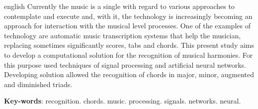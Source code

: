 \begin{resumo}[Abstract]
 \begin{otherlanguage*}{english}
   Currently the music is a single with regard to various approaches to contemplate and execute and, with it, the technology is increasingly becoming an approach for interaction with the musical level processes. One of the examples of technology are automatic music transcription systems that help the musician, replacing sometimes significantly scores, tabs and chords. This present study aims to develop a computational solution for the recognition of musical harmonies. For this purpose used techniques of signal processing and artificial neural networks. Developing solution allowed the recognition of chords in major, minor, augmented and diminished triads.

   \vspace{\onelineskip}

   \noindent
   \textbf{Key-words}: recognition. chords. music. processing. signals. networks. neural.
 \end{otherlanguage*}
\end{resumo}
